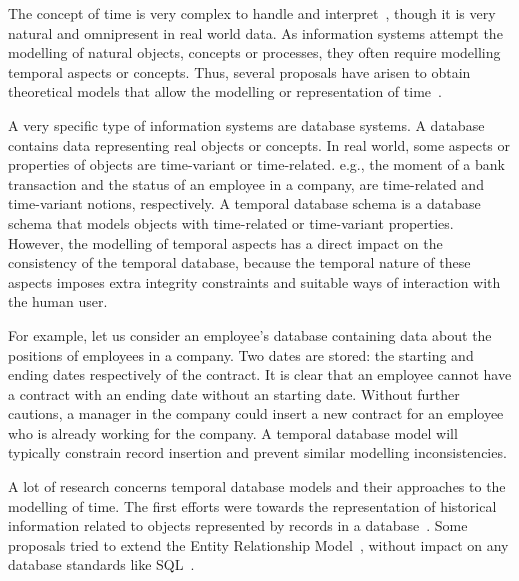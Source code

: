 %
%

The concept of time is very complex to handle and interpret~\cite{Klein1994,Shackle1961}, though it is very natural and omnipresent in real world data. As information systems attempt the modelling of natural objects, concepts or processes, they often require modelling temporal aspects or concepts. Thus, several proposals have arisen to obtain theoretical models that allow the modelling or representation of time~\cite{Bolour1982,VanderCruyssen1997}.

A very specific type of information systems are database systems. A database contains data representing real objects or concepts. In real world, some aspects or properties of objects are time-variant or time-related. e.g., the moment of a bank transaction and the status of an employee in a company, are time-related and time-variant notions, respectively.
A temporal database schema is a database schema that models objects with time-related or time-variant properties. However, the modelling of temporal aspects has a direct impact on the consistency of the temporal database, because the temporal nature of these aspects imposes extra integrity constraints and suitable ways of interaction with the human user. 

For example, let us consider an employee's database containing data about the positions of employees in a company. Two dates are stored: the starting and ending dates respectively of the contract. It is clear that an employee cannot have a contract with an ending date without an starting date. Without further cautions, a manager in the company could insert a new contract for an employee who is already working for the company. A temporal database model will typically constrain record insertion and prevent similar modelling inconsistencies.

A lot of research concerns temporal database models and their approaches to the modelling of time. The first efforts were towards the representation of historical information related to objects represented by records in a database~\cite{Clifford1985}. Some proposals tried to extend the Entity Relationship Model~\cite{Klopprogge1983}, without impact on any database standards like SQL~\cite{Sarda1990}.

